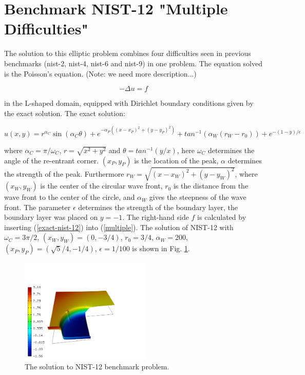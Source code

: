 \section{Benchmark NIST-12 "Multiple Difficulties"}
\label{sec:bench-12}

The solution to this elliptic problem combines four difficulties seen in previous benchmarks (nist-2, nist-4, nist-6 and nist-9) in one problem.
The equation solved is the Poisson's equation. (Note: we need more description...)

\begin{equation} \label{multiple}
-\Delta u = f
\end{equation}

in the L-shaped domain, equipped with Dirichlet boundary conditions
given by the exact solution.
The exact solution:

\begin{equation}\label{exact-nist-12}
u(x,y) =  r^{\alpha_{C} }\sin(\alpha_{C} \theta)
+ e^{-\alpha_{P} ((x - x_{P})^{2} + (y - y_{P})^{2})}
+ tan^{-1}(\alpha_{W} (r_{W} - r_{0}))
+ e^{-(1 - y) / \epsilon}
\end{equation}

where $\alpha_C = \pi / \omega_C$, $r = \sqrt{x^2+y^2}$
and $\theta = tan^{-1}(y/x)$, here $\omega_C$ determines
the angle of the re-entrant corner.
$(x_{P}, y_{P})$ is the location of the peak, $\alpha$
determines the strength of the peak. Furthermore
$r_{W} = \sqrt{(x - x_{W})^{2} + (y - y_{W})^{2}}$,
where $(x_{W}, y_{W})$ is the center of the circular wave front,
$r_{0}$ is the distance from the wave front to the
center of the circle, and $\alpha_W$ gives
the steepness of the wave front. The parameter $\epsilon$ determines the
strength of the boundary layer, the boundary layer was placed on $y = -1$.
The right-hand side $f$ is calculated by inserting (\ref{exact-nist-12})
into (\ref{multiple}). 
The solution of NIST-12 with $\omega_C = 3 \pi /2$,
$(x_{W}, y_{W}) = (0, -3/4)$, $r_{0} = 3/4$, $\alpha_{W} = 200$,
$(x_{P}, y_{P}) = (\sqrt{5} / 4, -1/4)$,
$\epsilon = 1/100$ is shown in Fig. \ref{fig:sln-nist12}.

\begin{figure}[!ht]
\centering
\includegraphics[height=5cm]{nist/nist-12/solution.png}
\caption{The solution to NIST-12 benchmark problem.}
\label{fig:sln-nist12}
\end{figure}

